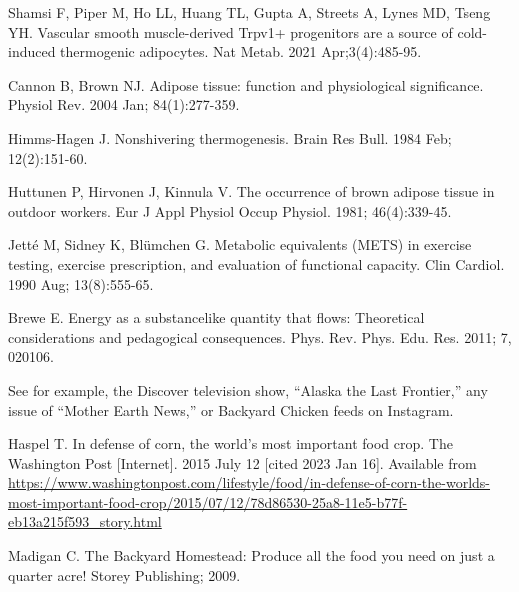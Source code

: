 \documentclass[12pt]{iopart}
\begin{document}
\begin{thebibliography}{99}
Shamsi F, Piper M, Ho LL, Huang TL, Gupta A, Streets A, Lynes MD, Tseng YH. 
Vascular smooth muscle-derived Trpv1+ progenitors are a source of cold-induced thermogenic adipocytes. 
Nat Metab. 
2021 Apr;3(4):485-95.

Cannon B, Brown NJ. 
Adipose tissue: function and physiological significance.
Physiol Rev. 
2004 Jan;
84(1):277-359. 

Himms-Hagen J. 
Nonshivering thermogenesis. 
Brain Res Bull. 
1984 Feb;
12(2):151-60. 

Huttunen P, Hirvonen J, Kinnula V. 
The occurrence of brown adipose tissue in outdoor workers. 
Eur J Appl Physiol Occup Physiol. 
1981;
46(4):339-45. 

Jetté M, Sidney K, Blümchen G. 
Metabolic equivalents (METS) in exercise testing, exercise prescription, and evaluation of functional capacity. 
Clin Cardiol. 
1990 Aug;
13(8):555-65. 

Brewe E.
Energy as a substancelike quantity that flows: Theoretical considerations
and pedagogical consequences.
Phys. Rev. Phys. Edu. Res.
2011; 
7, 020106.

See for example, the Discover television show, ``Alaska the Last Frontier,'' any issue of ``Mother Earth News,'' or Backyard Chicken feeds on Instagram.  
 
 
Haspel T.
In defense of corn, the world’s most important food crop.
The Washington Post [Internet].
2015 July 12 [cited 2023 Jan 16].
Available from \url{https://www.washingtonpost.com/lifestyle/food/in-defense-of-corn-the-worlds-most-important-food-crop/2015/07/12/78d86530-25a8-11e5-b77f-eb13a215f593_story.html}

Madigan C. 
The Backyard Homestead: Produce all the food you need on just a quarter acre!
Storey Publishing; 
2009.




\end{thebibliography}
\end{document}
